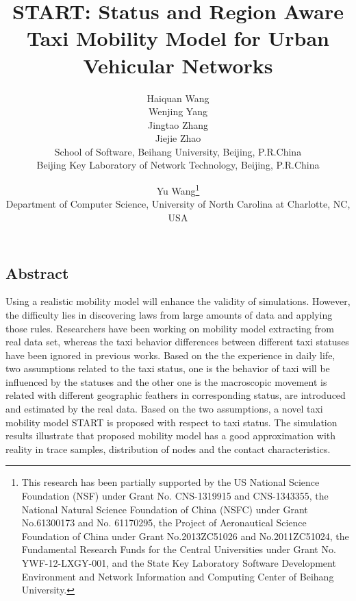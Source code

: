 \documentclass[camera-ready,twocolumn,10pt]{IEEEtran}
\begin{document}
\date{}

\title{\Large \bf START: Status and Region Aware Taxi Mobility Model for Urban Vehicular Networks}

\author{
{\rm Haiquan Wang}\\
{\rm Wenjing Yang}\\
{\rm Jingtao Zhang}\\
{\rm Jiejie Zhao}\\
School of Software, Beihang University, Beijing, P.R.China\\
Beijing Key Laboratory of Network Technology, Beijing, P.R.China\\
\and
{\rm Yu Wang\thanks{
 This research has been partially supported by the US National Science Foundation (NSF) under Grant No. CNS-1319915 and CNS-1343355, the National Natural Science Foundation of China (NSFC) under Grant No.61300173 and No. 61170295, the Project of Aeronautical Science Foundation of China under Grant No.2013ZC51026 and No.2011ZC51024, the Fundamental Research Funds for the Central Universities under Grant No. YWF-12-LXGY-001, and the State Key Laboratory Software Development Environment and Network Information and Computing Center of Beihang University.}}\\
Department of Computer Science, University of North Carolina at Charlotte, NC, USA\\
} %

\maketitle


\subsection*{Abstract}
Using a realistic mobility model will enhance the validity of simulations. However, the difficulty lies in discovering laws from large amounts of data and applying those rules. Researchers have been working on mobility model extracting from real data set, whereas the taxi behavior differences between different taxi statuses have been ignored in previous works.
Based on the the experience in daily life, two assumptions related to the taxi status, one is the behavior of taxi will be influenced by the statuses and the other one is the macroscopic movement is related with different geographic feathers in corresponding status, are introduced and estimated by the real data. Based on the two assumptions, a novel taxi mobility model START is proposed with respect to taxi status. The simulation results illustrate that proposed mobility model has a good approximation with reality in trace samples, distribution of nodes and the contact characteristics.
\end{document}
